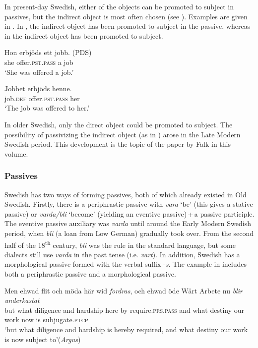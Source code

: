 \documentclass[output=paper]{langscibook}
\begin{document}
In present-day Swedish, either of the objects can be promoted to subject in passives, but the indirect object is most often chosen (see \citealt{Lundquist2004}). Examples are given in . In , the indirect object has been promoted to subject in the passive, whereas in  the indirect object has been promoted to subject.


\ea\label{ex:intro:28}
\ea\label{ex:intro:28a}
\gll  Hon   erbjöds         ett jobb. (PDS)\\
she   offer\textsc{.pst.pass}   a    job\\
\glt ‘She was offered a job.’

\ex\label{ex:intro:28b}
\gll  Jobbet   erbjöds         henne. \\
  job.\textsc{def}     offer.\textsc{pst.pass} her\\
    \glt `The job was offered to her.’
\z
\z



In older Swedish, only the direct object could be promoted to subject. The possibility of passivizing the indirect object (as in ) arose in the Late Modern Swedish period. This development is the topic of the paper by Falk in this volume.


\subsubsection{Passives}\label{sec:intro:3.3.2}


Swedish has two ways of forming passives, both of which already existed in Old Swedish. Firstly, there is a periphrastic passive with \textit{vara} ‘be’ (this gives a stative passive) or \textit{varda/bli} ‘become’ (yielding an eventive passive)\,+\,a passive participle. The eventive passive auxiliary was \textit{varda} until around the Early Modern Swedish period, when \textit{bli} (a loan from Low German) gradually took over. From the second half of the 18\textsuperscript{th} century, \textit{bli} was the rule in the standard language, but some dialects still use \textit{varda} in the past tense (i.e. \textit{vart}). In addition, Swedish has a morphological passive formed with the verbal suffix -\textit{s}. The example in  includes both a periphrastic passive and a morphological passive.


\ea\label{ex:intro:29}
\gll  Men  ehwad   flit         och   möda     här     wid \textit{fordras}, och ehwad öde   Wårt   Arbete nu \textit{blir} \textit{underkastat}\\
but   what   diligence and   hardship   here   by    require\textsc{.prs.pass} and what  destiny our     work   now   is     subjugate\textsc{.ptcp}\\
\glt ‘but what diligence and hardship is hereby required, and what destiny our work is now subject to’(\textit{Argus})
\z
\end{document}
